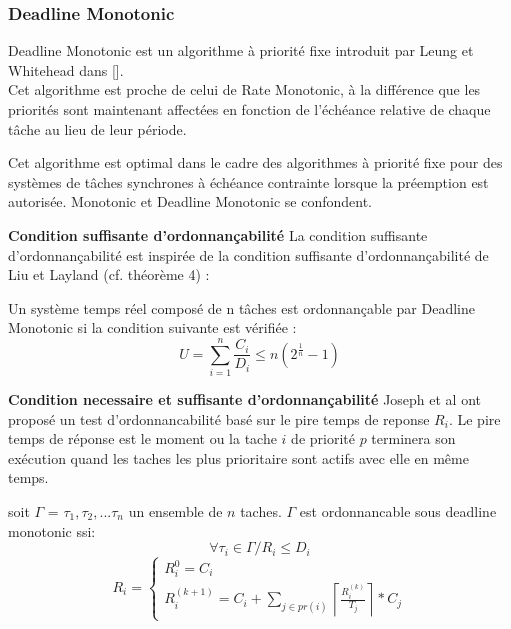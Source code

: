\subsubsection{Deadline Monotonic \cite{LW82}}
\vspace{-1cm}
Deadline Monotonic est un algorithme à priorité fixe introduit par Leung et Whitehead dans [\cite{LW82}].\\
Cet algorithme est proche de celui de Rate Monotonic, à la différence que les priorités sont maintenant affectées en fonction de l'échéance relative de chaque tâche au lieu de leur période.
\begin{theoreme}
Cet algorithme est optimal dans le cadre des algorithmes à priorité fixe pour des systèmes de tâches synchrones à échéance contrainte lorsque la préemption est autorisée. Monotonic et Deadline Monotonic se confondent.
\end{theoreme}

\textbf{Condition suffisante d'ordonnançabilité} La condition suffisante d'ordonnançabilité est inspirée de la condition suffisante d'ordonnançabilité de Liu et Layland (cf. théorème 4) :

\begin{theoreme}
 Un système temps réel composé de n tâches est ordonnançable par Deadline
Monotonic si la condition suivante est vérifiée :
\begin{equation}
U = \sum_{i=1}^n \frac{C_i}{D_i} \leq n ( 2^{\frac{1}{n}} - 1)
\end{equation}
\end{theoreme}

\textbf{Condition necessaire et suffisante d'ordonnançabilité} Joseph et al \cite{JP86} ont proposé un test d’ordonnancabilité basé sur le pire
temps de reponse $R_{i}$.  Le pire temps de réponse est le moment ou la tache $i$ de priorité $p$ terminera son exécution quand les taches les plus prioritaire sont actifs avec elle en même temps.\\

\begin{theoreme}
soit $\Gamma$ = $\tau_{1},\tau_{2},. . . \tau_{n}$ un ensemble de $n$
taches.  $\Gamma$ est ordonnancable sous deadline monotonic ssi:
\begin{equation}
\forall \tau_{i} \in \Gamma / R_{i} \leq D_{i}
\end{equation}
\begin{equation}
R_{i} = 
\left\lbrace
\begin{array}{l}
R_{i}^0=C_{i}
\\
 R_{i}^{(k+1)}=C_{i}+\sum_{j \in pr(i)}  \left \lceil 
 \frac{R_{i}^{(k)}}{T_{j}} \right \rceil * C_{j}  
\end{array}\right.
\end{equation}
\end{theoreme}


